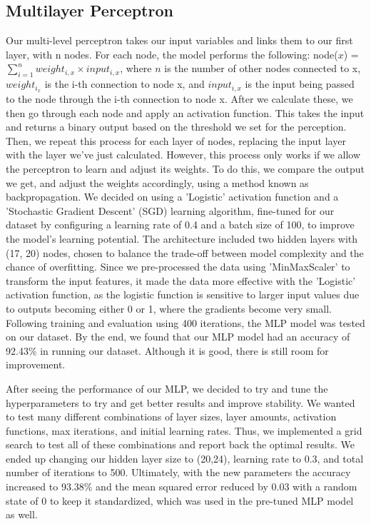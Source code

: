 \documentclass[11pt]{article}
\begin{document}
    \subsection{Multilayer Perceptron}
        Our multi-level perceptron takes our input variables and links them to our first layer, with n nodes. For each node, the model performs the following: node($x$) = $\sum^n_{i=1}weight_{i,x} \times input_{i,x}$, where $n$ is the number of other nodes connected to x, $weight_{i_x}$ is the i-th connection to node x, and $input_{i,x}$ is the input being passed to the node through the i-th connection to node x. After we calculate these, we then go through each node and apply an activation function. This takes the input and returns a binary output based on the threshold we set for the perception. Then, we repeat this process for each layer of nodes, replacing the input layer with the layer we’ve just calculated. However, this process only works if we allow the perceptron to learn and adjust its weights. To do this, we compare the output we get, and adjust the weights accordingly, using a method known as backpropagation. We decided on using a 'Logistic' activation function and a 'Stochastic Gradient Descent' (SGD) learning algorithm, fine-tuned for our dataset by configuring a learning rate of 0.4 and a batch size of 100, to improve the model's learning potential. The architecture included two hidden layers with (17, 20) nodes, chosen to balance the trade-off between model complexity and the chance of overfitting. Since we pre-processed the data using 'MinMaxScaler' to transform the input features, it made the data more effective with the 'Logistic' activation function, as the logistic function is sensitive to larger input values due to outputs becoming either 0 or 1, where the gradients become very small. Following training and evaluation using 400 iterations, the MLP model was tested on our dataset. By the end, we found that our MLP model had an accuracy of 92.43\% in running our dataset. Although it is good, there is still room for improvement.
        
        After seeing the performance of our MLP, we decided to try and tune the hyperparameters to try and get better results and improve stability. We wanted to test many different combinations of layer sizes, layer amounts, activation functions, max iterations, and initial learning rates. Thus, we implemented a grid search to test all of these combinations and report back the optimal results. We ended up changing our hidden layer size to (20,24), learning rate to 0.3, and total number of iterations to 500. Ultimately, with the new parameters the accuracy increased to 93.38\% and the mean squared error reduced by 0.03 with a random state of 0 to keep it standardized, which was used in the pre-tuned MLP model as well.
\end{document}
